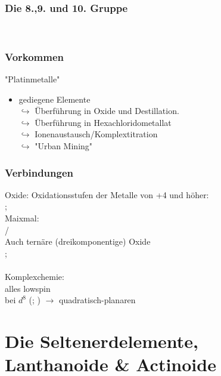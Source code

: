 \documentclass[a4paper, fleqn]{article}
\begin{document}
\subsubsection{Die 8.,9. und 10. Gruppe}
\\
\subsubsection{Vorkommen}
"Platinmetalle"\\
\begin{itemize}
    \item gediegene Elemente\\ $\hookrightarrow$ Überführung in Oxide und Destillation.\\$\hookrightarrow$ Überführung in Hexachloridometallat\\$\hookrightarrow$ Ionenaustausch/Komplextitration\\$\hookrightarrow$ "Urban Mining"
\end{itemize}
\subsubsection{Verbindungen}
Oxide: Oxidationsstufen der Metalle von +4 und höher:\\
; \\
Maixmal:\\
 / \\
Auch ternäre (dreikomponentige) Oxide\\
; \\\\
Komplexchemie:\\
alles lowspin\\
bei $d^8$ (; ) $\rightarrow$ quadratisch-planaren

\section{Die Seltenerdelemente, Lanthanoide \& Actinoide}
\end{document}
